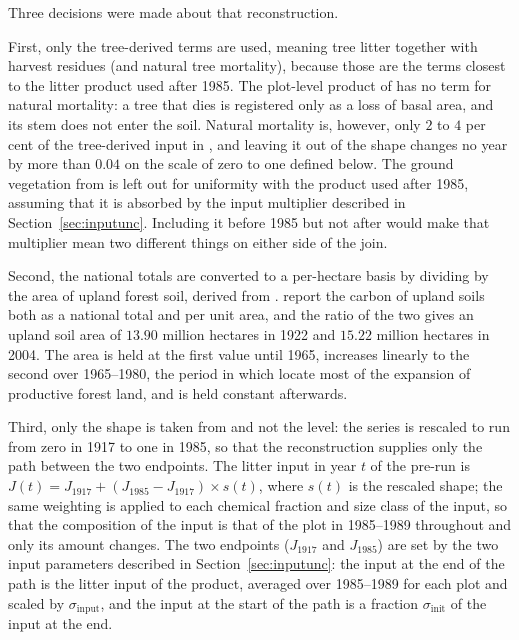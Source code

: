 \documentclass[11pt]{article}
\newcommand{\sinput}{\sigma_{\mathrm{input}}}
\newcommand{\sinit}{\sigma_{\mathrm{init}}}
\begin{document}
Three decisions were made about that reconstruction. 

First, only the
tree-derived terms are used, meaning tree litter together with harvest residues (and natural tree mortality), because those are the terms closest to the litter product used
after 1985. The plot-level product of \citet{TupekLitter} has no term for natural mortality: a tree that dies is registered only as a loss of basal area, and its stem does not enter the soil. Natural mortality is, however, only $2$ to $4$ per cent of the tree-derived input in \citet{Liski2006}, and leaving it out of the shape changes no year by more than $0.04$ on the scale of zero to one defined below.
The ground vegetation from \citet{Liski2006} is left out for uniformity with the product used after 1985, assuming that it is absorbed by the input multiplier described in
Section~\ref{sec:inputunc}. Including it before 1985 but not after would make that
multiplier mean two different things on either side of the join. 

Second, the national totals
are converted to a per-hectare basis by dividing by the area of upland forest soil, derived from \citet{Liski2006}.
\citet{Liski2006} report the carbon of upland soils both as a national total and per unit area, and the ratio of the two gives an upland soil area of $13.90$ million hectares in 1922 and $15.22$ million hectares in 2004. The area is held at the first value until 1965, increases linearly to the second over 1965--1980, the period in which \citet{Korhonen2024} locate most of the expansion of productive forest land, and is held constant afterwards.

Third, only
the shape is taken from \citet{Liski2006} and not the level: the series is rescaled to run from zero in 1917 to one in
1985, so that the reconstruction supplies only the path between the two endpoints. 
The litter input in year $t$ of the pre-run is $J(t) = J_{1917} + (J_{1985} - J_{1917}) \times s(t)$, where $s(t)$ is the rescaled shape; the same weighting is applied to each chemical fraction and size class of the input, so that the composition of the input is that of the plot in 1985--1989 throughout and only its amount changes.
The two
endpoints ($J_{1917}$ and $J_{1985}$) are set by the two input parameters described in Section~\ref{sec:inputunc}: the input at the end of the path is the litter input of the product, averaged over 1985--1989 for each plot
and scaled by $\sinput$, and the input at the start of the path is a fraction $\sinit$ of the
input at the end.
\end{document}
